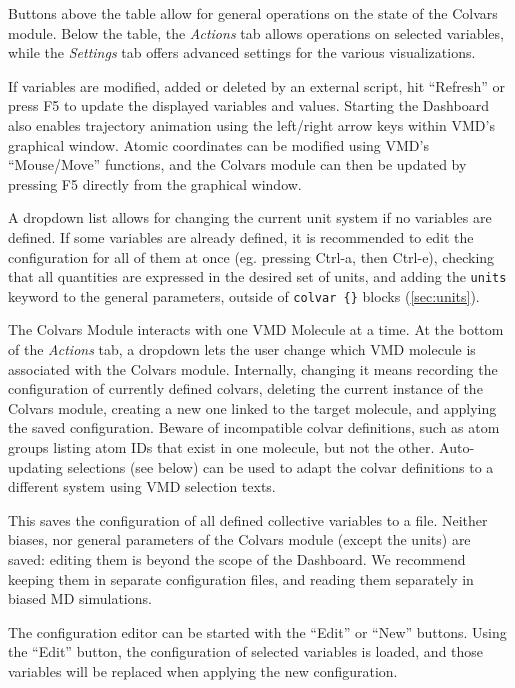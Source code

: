 {Buttons above the table allow for general operations on the state of the Colvars module.
Below the table, the \textit{Actions} tab allows operations on selected variables, while the \textit{Settings} tab offers advanced settings for the various visualizations.

If variables are modified, added or deleted by an external script, hit ``Refresh'' or press F5 to update the displayed variables and values.
Starting the Dashboard also enables trajectory animation using the left/right arrow keys within VMD's graphical window.
Atomic coordinates can be modified using VMD's ``Mouse/Move'' functions, and the Colvars module can then be updated by pressing F5 directly from the graphical window.

A dropdown list allows for changing the current unit system if no variables are defined.
If some variables are already defined, it is recommended to edit the configuration for all of
them at once (eg. pressing Ctrl-a, then Ctrl-e), checking that all quantities are expressed in the desired set of units, and adding the
\texttt{units} keyword to the general parameters, outside of \texttt{colvar \{\}} blocks (\ref{sec:units}).

The Colvars Module interacts with one VMD Molecule at a time.
At the bottom of the \textit{Actions} tab, a  dropdown lets the user change which VMD molecule is associated with the Colvars module.
Internally, changing it means recording the configuration of currently defined colvars, deleting the current instance of the Colvars module,
creating a new one linked to the target molecule, and applying the saved configuration.
Beware of incompatible colvar definitions, such as atom groups listing atom IDs that exist in one molecule, but not the other.
Auto-updating selections (see below) can be used to adapt the colvar definitions to a different system using VMD selection texts.


This saves the configuration of all defined collective variables to a file.
Neither biases, nor general parameters of the Colvars module (except the units) are saved: editing them is beyond the scope of the Dashboard.
We recommend keeping them in separate configuration files, and reading them separately in biased MD simulations.


The configuration editor can be started with the ``Edit'' or ``New'' buttons.
Using the ``Edit'' button, the configuration of selected variables is loaded, and those variables will be replaced when applying the new configuration.

}

